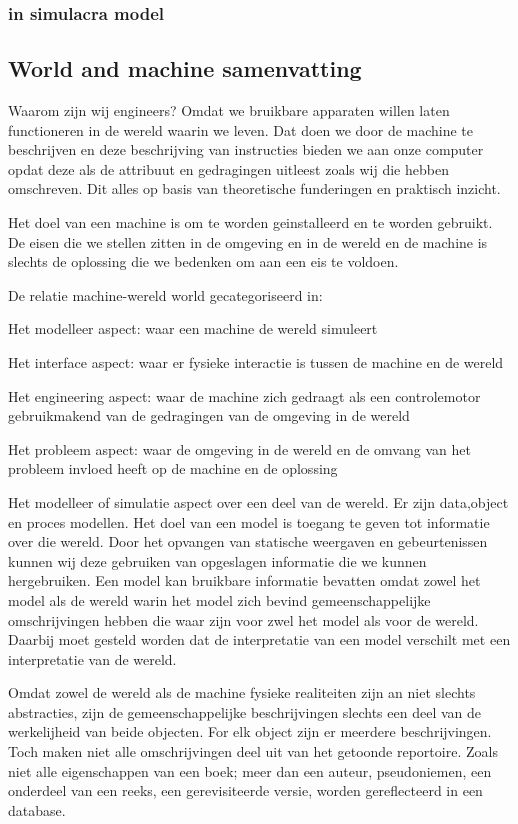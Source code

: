 \documentclass{article}
\begin{document}
\subsubsection{in simulacra model}

\subsection{World and machine samenvatting}
Waarom zijn wij engineers? Omdat we bruikbare apparaten willen laten functioneren in de wereld waarin we leven. Dat doen we door de machine te beschrijven en deze beschrijving van instructies bieden we aan onze computer opdat deze als de attribuut en gedragingen uitleest zoals wij die hebben omschreven. Dit alles op basis van theoretische funderingen en praktisch inzicht. 

Het doel van een machine is om te worden geinstalleerd en te worden gebruikt. De eisen die we stellen zitten in de omgeving en in de wereld en de machine is slechts de oplossing die we bedenken om aan een eis te voldoen. 

De relatie machine-wereld world gecategoriseerd in: 

Het modelleer aspect: waar een machine de wereld simuleert 

Het interface aspect: waar er fysieke interactie is tussen de machine en de wereld 

Het engineering aspect: waar de machine zich gedraagt als een controlemotor gebruikmakend van de gedragingen van de omgeving in de wereld 

Het probleem aspect: waar de omgeving in de wereld en de omvang van het probleem invloed heeft op de machine en de oplossing 

Het modelleer  of simulatie aspect over een deel van de wereld. Er zijn data,object en proces modellen. Het doel van een model is toegang te geven tot informatie over die wereld. Door het opvangen van statische weergaven en gebeurtenissen kunnen wij deze gebruiken van opgeslagen informatie die we kunnen hergebruiken. Een model kan bruikbare informatie bevatten omdat zowel het model als de wereld warin het model zich bevind gemeenschappelijke omschrijvingen hebben die waar zijn voor zwel het model als voor de wereld. Daarbij moet gesteld worden dat de interpretatie van een model verschilt met een interpretatie van de wereld. 

Omdat zowel de wereld als de machine fysieke realiteiten zijn an niet slechts abstracties, zijn de gemeenschappelijke beschrijvingen slechts een deel van de werkelijheid van beide objecten. For elk object zijn er meerdere beschrijvingen. Toch maken niet alle omschrijvingen deel uit van het getoonde reportoire. Zoals niet alle eigenschappen van een boek; meer dan een auteur, pseudoniemen, een onderdeel van een reeks, een gerevisiteerde versie, worden gereflecteerd in een database.  
\end{document}
